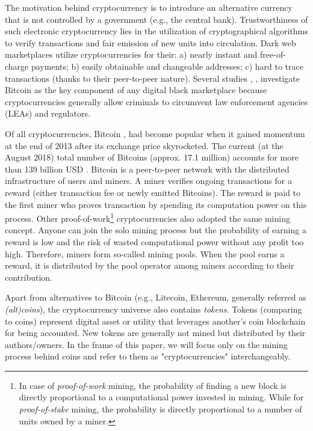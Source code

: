 \documentclass[preprint,12pt,3p]{elsarticle}
\begin{document}
The motivation behind cryptocurrency is to introduce an alternative currency that is not controlled by a government (e.g., the central bank). Trustworthiness of such electronic cryptocurrency lies in the utilization of cryptographical algorithms to verify transactions and fair emission of new units into circulation. Dark web marketplaces utilize cryptocurrencies for their: a) nearly instant and free-of-charge payments; b) easily obtainable and changeable addresses; c) hard to trace transactions (thanks to their peer-to-peer nature). Several studies \cite{RAESSI15}, \cite{GRINBERG14}, \cite{JOHNSON14} investigate Bitcoin as the key component of any digital black marketplace because cryptocurrencies generally allow criminals to circumvent law enforcement agencies (LEAs) and regulators. 

Of all cryptocurrencies, Bitcoin \cite{BTCPAPER}, \cite{BTCORG} had become popular when it gained momentum at the end of 2013 after its exchange price skyrocketed. The current (at the August 2018) total number of Bitcoins (approx. 17.1 million) accounts for more than 139 billion USD \cite{BTCCAP}. Bitcoin is a peer-to-peer network with the distributed infrastructure of users and miners. A miner verifies ongoing transactions for a reward (either transaction fee or newly emitted Bitcoins). The reward is paid to the first miner who proves transaction by spending its computation power on this process. Other proof-of-work\footnote{In case of  \textit{proof-of-work} mining, the probability of finding a new block is directly proportional to a computational power invested in mining. While for \textit{proof-of-stake} mining, the probability is directly proportional to a number of units owned by a miner.} cryptocurrencies also adopted the same mining concept. Anyone can join the solo mining process but the probability of earning a reward is low and the risk of wasted computational power without any profit too high. Therefore, miners form so-called mining pools. When the pool earns a reward, it is distributed by the pool operator among miners according to their contribution. 

Apart from alternatives to Bitcoin (e.g., Litecoin, Ethereum, generally referred as \textit{(alt)coins}), the cryptocurrency universe also contains \textit{tokens}. Tokens (comparing to coins) represent digital asset or utility that leverages another's coin blockchain for being accounted. New tokens are generally not mined but distributed by their authors/owners. In the frame of this paper, we will focus only on the mining process behind coins and refer to them as "cryptocurrencies" interchangeably.
\end{document}
